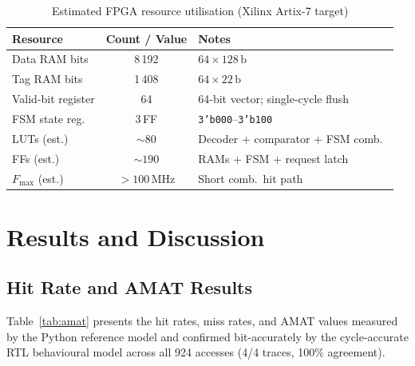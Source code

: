 \documentclass[conference]{IEEEtran}
\renewcommand{\_}{\textunderscore\allowbreak{}}
\begin{document}
\begin{table}[!t]
  \centering
  \caption{Estimated FPGA resource utilisation (Xilinx Artix-7 target)}
  \label{tab:synth}
  \renewcommand{\arraystretch}{1.25}
  \small
  \begin{tabular}{@{}lcP{3.1cm}@{}}
    \toprule
    \textbf{Resource} & \textbf{Count / Value} & \textbf{Notes} \\
    \midrule
    Data RAM bits    & 8\,192  & $64 \times 128\,\mathrm{b}$ \\
    Tag RAM bits     & 1\,408  & $64 \times 22\,\mathrm{b}$ \\
    Valid-bit register & 64   & 64-bit vector; single-cycle flush \\
    FSM state reg.   & 3\,FF  & \texttt{3'b000}--\texttt{3'b100} \\
    LUTs (est.)      & ${\sim}80$ & Decoder + comparator + FSM comb.\ \\
    FFs  (est.)      & ${\sim}190$& RAMs + FSM + request latch \\
    $F_{\max}$ (est.)& $>100\,\mathrm{MHz}$ & Short comb.\ hit path \\
    \bottomrule
  \end{tabular}
\end{table}

\section{Results and Discussion}
\label{sec:results}

\subsection{Hit Rate and AMAT Results}

Table~\ref{tab:amat} presents the hit rates, miss rates, and AMAT values
measured by the Python reference model and confirmed bit-accurately by
the cycle-accurate RTL behavioural model across all 924 accesses
(4/4 traces, 100\% agreement).
\end{document}
